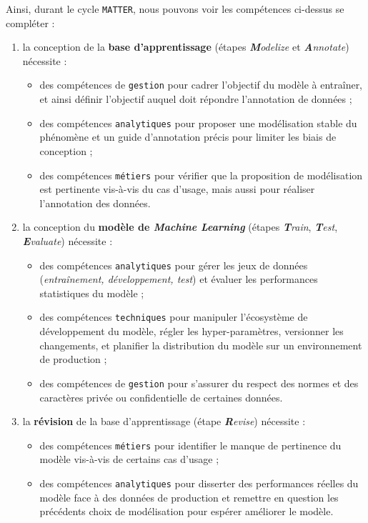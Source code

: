 		Ainsi, durant le cycle \texttt{MATTER}, nous pouvons voir les compétences ci-dessus se compléter :
		\begin{enumerate}
			\item la conception de la \textbf{base d'apprentissage} (étapes \textit{\textbf{M}odelize} et \textit{\textbf{A}nnotate}) nécessite :
			\begin{itemize}
				\item des compétences de \texttt{gestion} pour cadrer l'objectif du modèle à entraîner, et ainsi définir l'objectif auquel doit répondre l'annotation de données ;
				\item des compétences \texttt{analytiques} pour proposer une modélisation stable du phénomène et un guide d'annotation précis pour limiter les biais de conception ;
				\item des compétences \texttt{métiers} pour vérifier que la proposition de modélisation est pertinente vis-à-vis du cas d'usage, mais aussi pour réaliser l'annotation des données.
			\end{itemize}
			\item la conception du \textbf{modèle de \textit{Machine Learning}} (étapes \textit{\textbf{T}rain}, \textit{\textbf{T}est}, \textit{\textbf{E}valuate}) nécessite :
			\begin{itemize}
				\item des compétences \texttt{analytiques} pour gérer les jeux de données (\textit{entraînement, développement, test}) et évaluer les performances statistiques du modèle ;
				\item des compétences \texttt{techniques} pour manipuler l'écosystème de développement du modèle, régler les hyper-paramètres, versionner les changements, et planifier la distribution du modèle sur un environnement de production ;
				\item des compétences de \texttt{gestion} pour s'assurer du respect des normes et des caractères privée ou confidentielle de certaines données.
			\end{itemize}
			\item la \textbf{révision} de la base d'apprentissage (étape \textit{\textbf{R}evise}) nécessite :
			\begin{itemize}
				\item des compétences \texttt{métiers} pour identifier le manque de pertinence du modèle vis-à-vis de certains cas d'usage ;
				\item des compétences \texttt{analytiques} pour disserter des performances réelles du modèle face à des données de production et remettre en question les précédents choix de modélisation pour espérer améliorer le modèle.
			\end{itemize}
		\end{enumerate}
		
